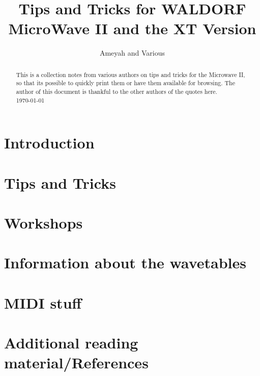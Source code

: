 \documentclass[a4paper,12pt,leqno]{article}%
\title{Tips and Tricks for WALDORF MicroWave II and the XT Version}
\author{Ameyah and Various}
\theoremstyle{plain}
\begin{document}
\maketitle
\begin{abstract}
	\noindent
	This is a collection notes from various authors on tips and tricks for the Microwave II, so that its possible to quickly print them or have them available for browsing. The author of this document is thankful to the other authors of the quotes here.\\
	\today
\end{abstract}

\newpage

\tableofcontents

\newpage

\section{Introduction}

\section{Tips and Tricks}

\section{Workshops}

\section{Information about the wavetables}

\section{MIDI stuff}

\section{Additional reading material/References}

\end{document}
